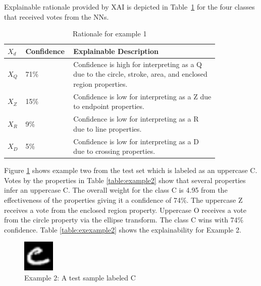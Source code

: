 \documentclass[conference]{IEEEtran}
\begin{document}
Explainable rationale provided by XAI is depicted in Table~\ref{table:exexample1} for the four classes that
received votes from the NNs.

\begin{table}
    \caption{Rationale for example 1}
    \centering
    \begin{tabular}{| p{0.04\linewidth} | p{0.14\linewidth} | p{0.65\linewidth} |}
    \hline
     $X_d$ & Confidence & Explainable Description \\
    \hline \cline{1-3}
    $X_Q$ & 71\% & Confidence is high for interpreting as a Q due to the circle, stroke, area, and enclosed region properties. \\ 
    \hline
    $X_Z$ & 15\% & Confidence is low for interpreting as a Z due to endpoint properties. \\
    \hline
    $X_R$ & 9\% & Confidence is low for interpreting as a R due to line properties. \\
    \hline
    $X_D$ & 5\% & Confidence is low for interpreting as a D due to crossing properties. \\
    \hline
    \end{tabular}
    \label{table:exexample1}
\end{table}

Figure \ref{fig:ex2} shows example two from the test set which is labeled as an
uppercase C. Votes by the properties in Table \ref{table:example2} show that
several properties infer an uppercase C.  The overall weight for the class C is 4.95 from the effectiveness
of the properties giving it a confidence of 74\%. The uppercase Z receives a
vote from the enclosed region property. Uppercase O receives a vote from the
circle property via the ellipse transform.  The class C wins with 74\% confidence.
Table \ref{table:exexample2} shows the explainability for Example 2.

\begin{figure}
    \centering
    \includegraphics[width=1.5cm]{./images/examples/test-C-1.png}
    \caption{Example 2: A test sample labeled C}
    \label{fig:ex2}
\end{figure}
\end{document}
